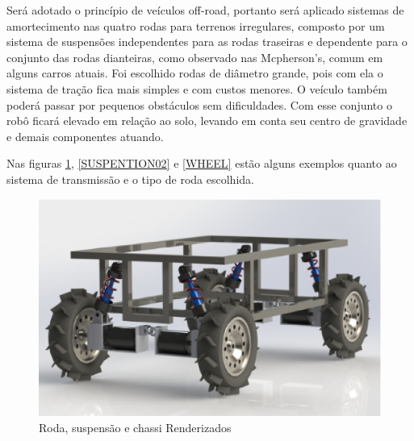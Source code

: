   Será adotado o princípio de veículos off-road, portanto será aplicado sistemas de amortecimento nas quatro rodas para terrenos
  irregulares, composto por um sistema de suspensões independentes para as rodas traseiras e dependente para o conjunto das
  rodas dianteiras, como observado nas Mcpherson's, comum em alguns carros atuais. Foi escolhido rodas de diâmetro grande,
  pois com ela o sistema de tração fica mais simples e com custos menores. O veículo também poderá passar por pequenos
  obstáculos sem dificuldades. Com esse conjunto o robô ficará elevado em relação ao solo, levando em conta seu centro
  de gravidade e demais componentes atuando.

  Nas figuras \ref{SUSPENTION01}, \ref{SUSPENTION02} e \ref{WHEEL} estão alguns exemplos quanto ao sistema de transmissão e o tipo de roda escolhida.

  \vfill

  \begin{figure}[!htbp]
  \begin{center}
  \includegraphics[keepaspectratio=true,scale=0.5]{figuras/suspention01.eps}
  \caption{\label{SUSPENTION01}Roda, suspensão e chassi Renderizados}
  \end{center}
  \end{figure}

